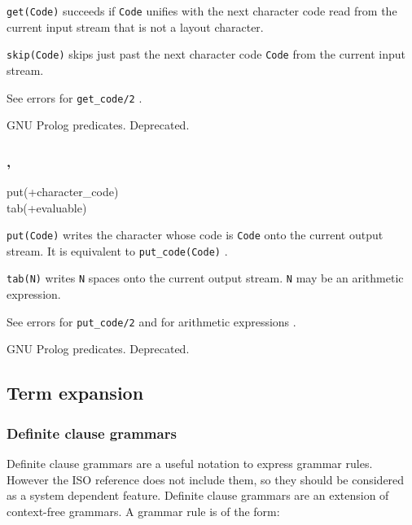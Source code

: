 \texttt{get(Code)} succeeds if \texttt{Code} unifies with the next character
code read from the current input stream that is not a layout character.

\texttt{skip(Code)} skips just past the next character code \texttt{Code}
from the current input stream.

\Errors

See errors for \texttt{get\_code/2} .

\Portability

GNU Prolog predicates. Deprecated.

\subsubsection{,
               }

\begin{TemplatesOneCol}
put(+character\_code)\\
tab(+evaluable)

\end{TemplatesOneCol}

\Description

\texttt{put(Code)} writes the character whose code is \texttt{Code} onto the
current output stream. It is equivalent to \texttt{put\_code(Code)}
.

\texttt{tab(N)} writes \texttt{N} spaces onto the current output
stream. \texttt{N} may be an arithmetic expression.

\Errors

See errors for \texttt{put\_code/2}  and for arithmetic
expressions .

\Portability

GNU Prolog predicates. Deprecated.

\subsection{Term expansion}
\label{Term-expansion}

\subsubsection{Definite clause grammars}
\label{DCG}

Definite clause grammars are a useful notation to express grammar rules.
However the ISO reference does not include them, so they should be considered
as a system dependent feature. Definite clause grammars are an extension of
context-free grammars. A grammar rule is of the form:

